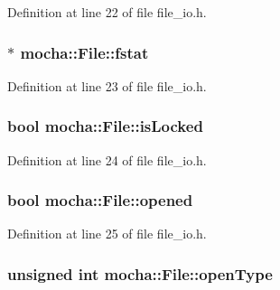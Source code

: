 Definition at line 22 of file file\_\-io.h.

\hypertarget{classmocha_1_1_file_a1af3675df21335d14aefa9d775c808e2}{
\subsubsection[{fstat}]{$\ast$ {\bf mocha::File::fstat}}}
\label{classmocha_1_1_file_a1af3675df21335d14aefa9d775c808e2}


Definition at line 23 of file file\_\-io.h.

\hypertarget{classmocha_1_1_file_a9c49e57fb0a425d80226ea3962f7f1ad}{
\subsubsection[{isLocked}]{\setlength{\rightskip}{0pt plus 5cm}bool {\bf mocha::File::isLocked}}}
\label{classmocha_1_1_file_a9c49e57fb0a425d80226ea3962f7f1ad}


Definition at line 24 of file file\_\-io.h.

\hypertarget{classmocha_1_1_file_a3a79db70f833a45ee94ea3f35ce270b8}{
\subsubsection[{opened}]{\setlength{\rightskip}{0pt plus 5cm}bool {\bf mocha::File::opened}}}
\label{classmocha_1_1_file_a3a79db70f833a45ee94ea3f35ce270b8}


Definition at line 25 of file file\_\-io.h.

\hypertarget{classmocha_1_1_file_aedc322e34cdfe5248644cf425b165ae7}{
\subsubsection[{openType}]{\setlength{\rightskip}{0pt plus 5cm}unsigned int {\bf mocha::File::openType}}}
\label{classmocha_1_1_file_aedc322e34cdfe5248644cf425b165ae7}


